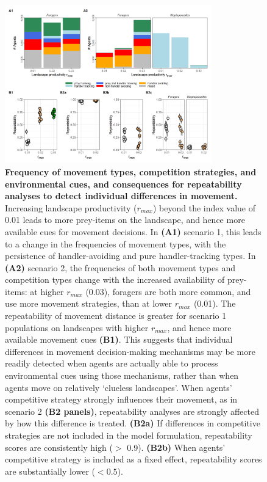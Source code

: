 \begin{figure}[h!]
    \centering
    \includegraphics[width=0.8\textwidth]{figures/patternprocess/fig_03.png}
    \caption{
        \textbf{Frequency of movement types, competition strategies, and environmental cues, and consequences for repeatability analyses to detect individual differences in movement.}
        Increasing landscape productivity ($r_{max}$) beyond the index value of 0.01 leads to more prey-items on the landscape, and hence more available cues for movement decisions.
        In \textbf{(A1)} scenario 1, this leads to a change in the frequencies of movement types, with the persistence of handler-avoiding and pure handler-tracking types.
        In \textbf{(A2)} scenario 2, the frequencies of both movement types and competition types change with the increased availability of prey-items: at higher $r_{max}$ (0.03), foragers are both more common, and use more movement strategies, than at lower $r_{max}$ (0.01).
        The repeatability of movement distance is greater for scenario 1 populations on landscapes with higher $r_{max}$, and hence more available movement cues \textbf{(B1)}.
        This suggests that individual differences in movement decision-making mechanisms may be more readily detected when agents are actually able to process environmental cues using those mechanisms, rather than when agents move on relatively `clueless landscapes'.
        When agents' competitive strategy strongly influences their movement, as in scenario 2 \textbf{(B2 panels)}, repeatability analyses are strongly affected by how this difference is treated.
        \textbf{(B2a)} If differences in competitive strategies are not included in the model formulation, repeatability scores are consistently high ($>$ 0.9).
        \textbf{(B2b)} When agents' competitive strategy is included as a fixed effect, repeatability scores are substantially lower ($< 0.5$).
}
\end{figure}
